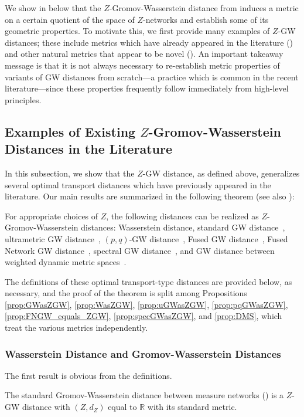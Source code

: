 \documentclass[twoside,11pt]{article}
\theoremstyle{definition}
\newcommand{\R}{\mathbb{R}}
\begin{document}
We show in  below that the $Z$-Gromov-Wasserstein distance from  induces a metric on a certain quotient of the space of $Z$-networks and establish some of its geometric properties. To motivate this, we first provide many examples of $Z$-GW distances; these include metrics which have already appeared in the literature () and other natural metrics that appear to be novel (). An important takeaway message is that it is not always necessary to re-establish metric properties of variants of GW distances from scratch---a practice which is common in the recent literature---since these properties frequently follow immediately from high-level principles. 

\subsection{Examples of Existing \texorpdfstring{$Z$}{Z}-Gromov-Wasserstein Distances in the Literature}\label{sec:existing_ZGW}
In this subsection, we show that the $Z$-GW distance, as defined above, generalizes several optimal transport distances which have previously appeared in the literature. Our main results are summarized in the following theorem (see also ):
\begin{theorem}\label{thm:ZGW_generalizes}
    For appropriate choices of $Z$, the following distances can be realized as $Z$-Gromov-Wasserstein distances: Wasserstein distance, standard GW distance~\citep{memoli2007}, ultrametric GW distance~\citep{memoli2021ultrametric}, $(p,q)$-GW distance~\citep{arya2023gromov}, Fused GW distance~\citep{vayer2020fused}, Fused Network GW distance~\citep{yang2023exploiting}, spectral GW distance~\citep{memoli2009spectral}, and GW distance between weighted dynamic metric spaces~\citep{woojin-thesis}.
\end{theorem}
The definitions of these optimal transport-type distances are provided below, as necessary, and the proof of the theorem is split  among Propositions \ref{prop:GWasZGW}, \ref{prop:WasZGW}, \ref{prop:uGWasZGW}, \ref{prop:pqGWasZGW}, \ref{prop:FNGW_equals_ZGW}, \ref{prop:specGWasZGW}, and \ref{prop:DMS}, which treat the various metrics independently.

\subsubsection{Wasserstein Distance and Gromov-Wasserstein Distances}
The first result is obvious from the definitions. 
\begin{proposition}\label{prop:GWasZGW}
    The standard Gromov-Wasserstein distance between measure networks () is a $Z$-GW distance with $(Z,d_Z)$ equal to $\R$ with its standard metric. 
\end{proposition}
\end{document}
